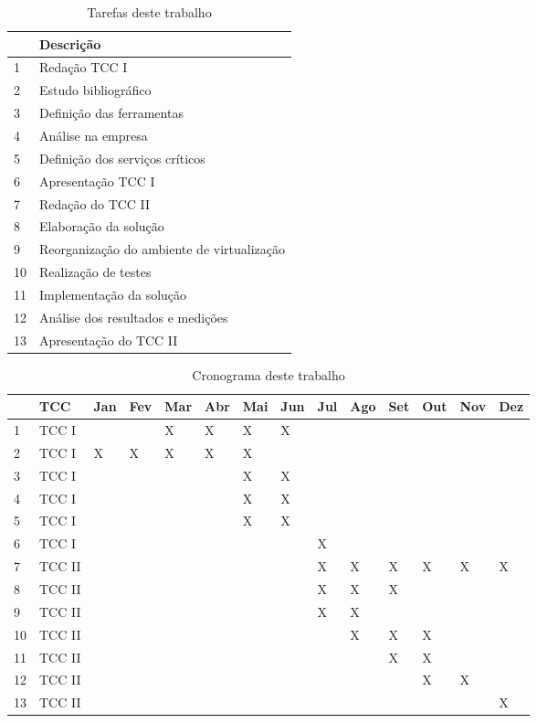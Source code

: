 \begin{table}[h!]\normalsize
\caption {Tarefas deste trabalho}
\label{tab:impltarefas}
\begin{center}
\begin{tabular}{|l|l|}\hline
 & Descrição \\\hline
1 & Redação TCC I \\\hline
2 & Estudo bibliográfico \\\hline
3 & Definição das ferramentas \\\hline
4 & Análise na empresa \\\hline
5 & Definição dos serviços críticos \\\hline
6 & Apresentação TCC I \\\hline
7 & Redação do TCC II \\\hline
8 & Elaboração da solução \\\hline
9 & Reorganização do ambiente de virtualização \\\hline
10 & Realização de testes \\\hline
11 & Implementação da solução \\\hline
12 & Análise dos resultados e medições \\\hline
13 & Apresentação do TCC II \\\hline
\end{tabular}
\end{center}
\end{table}

\begin{table}[h!]\normalsize %
\caption {Cronograma deste trabalho}
\label{tab:implcronograma}
\begin{center}
\def\arraystretch{1}
\setlength{\tabcolsep}{0.15cm}
\begin{tabular}{|l|l|l|l|l|l|l|l|l|l|l|l|l|l|}\hline
 & TCC & Jan & Fev & Mar & Abr & Mai & Jun & Jul & Ago & Set & Out & Nov & Dez \\\hline
1 & TCC I & & & X & X & X & X & & & & & & \\\hline
2 & TCC I & X & X & X & X & X & & & & & & & \\\hline
3 & TCC I & & & & & X & X & & & & & & \\\hline
4 & TCC I & & & & & X & X & & & & & & \\\hline
5 & TCC I & & & & & X & X & & & & & & \\\hline
6 & TCC I & & & & & & & X & & & & & \\\hline
7 & TCC II & & & & & & & X & X & X & X & X & X \\\hline
8 & TCC II & & & & & & & X & X & X & & & \\\hline
9 & TCC II & & & & & & & X & X & & & & \\\hline
10 & TCC II & & & & & & & & X & X & X & & \\\hline
11 & TCC II & & & & & & & & & X & X & & \\\hline
12 & TCC II & & & & & & & & & & X & X & \\\hline
13 & TCC II & & & & & & & & & & & & X \\\hline
\end{tabular}
\end{center}
\end{table}
